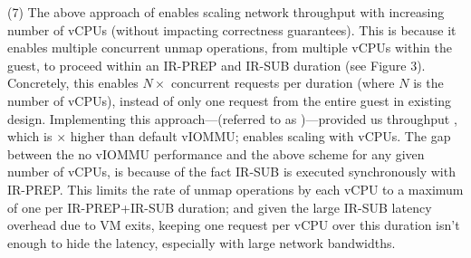 

(7) The above approach of enables scaling network throughput with increasing number of vCPUs (without impacting correctness guarantees). This is because it enables multiple concurrent unmap operations, from multiple vCPUs within the guest, to proceed within an IR-PREP and IR-SUB duration (see Figure 3). Concretely, this enables $N\times$ concurrent requests per duration (where $N$ is the number of vCPUs), instead of only one request from the entire guest in existing design. Implementing this approach---(referred to as )---provided us throughput , which is $\times$ higher than default vIOMMU; enables scaling with vCPUs. The gap between the no vIOMMU performance and the above scheme for any given number of vCPUs, is because of the fact IR-SUB is executed synchronously with IR-PREP. This limits the rate of unmap operations by each vCPU to a maximum of one per IR-PREP+IR-SUB duration; and given the large IR-SUB latency overhead due to VM exits, keeping one request per vCPU over this duration isn't enough to hide the latency, especially with large network bandwidths. 


